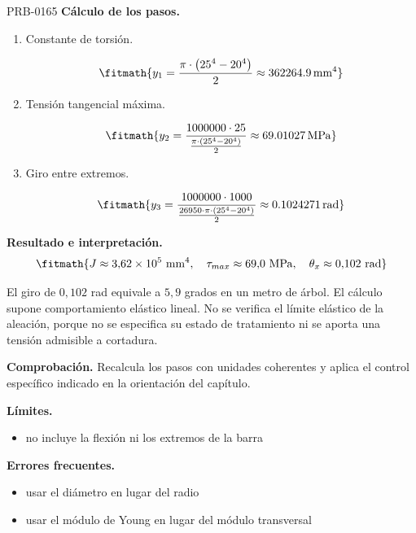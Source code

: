 \begin{studiumworked}{PRB-0165}
\textbf{Cálculo de los pasos.}

\begin{enumerate}

\item Constante de torsión.

\[\fitmath{y_{1}=\frac{\pi\cdot \left({25}^{4}-{20}^{4}\right)}{2}\approx 362264.9\,\mathrm{mm^{4}}}\]

\item Tensión tangencial máxima.

\[\fitmath{y_{2}=\frac{1000000\cdot 25}{\frac{\pi\cdot \left({25}^{4}-{20}^{4}\right)}{2}}\approx 69.01027\,\mathrm{MPa}}\]

\item Giro entre extremos.

\[\fitmath{y_{3}=\frac{1000000\cdot 1000}{\frac{26950\cdot \pi\cdot \left({25}^{4}-{20}^{4}\right)}{2}}\approx 0.1024271\,\mathrm{rad}}\]

\end{enumerate}

\textbf{Resultado e interpretación.}\[\fitmath{J \approx 3{,}62\times 10^{5}\ \mathrm{mm}^{4},\quad \tau_{max} \approx 69{,}0\ \mathrm{MPa},\quad \theta_x \approx 0{,}102\ \mathrm{rad}}\]

El giro de $0{,}102$ rad equivale a $5{,}9$ grados en un metro de árbol. El cálculo supone comportamiento elástico lineal. No se verifica el límite elástico de la aleación, porque no se especifica su estado de tratamiento ni se aporta una tensión admisible a cortadura.

\par\textbf{Comprobación.} Recalcula los pasos con unidades coherentes y aplica el control específico indicado en la orientación del capítulo.

\textbf{Límites.}\begin{itemize}\item no incluye la flexión ni los extremos de la barra\end{itemize}

\textbf{Errores frecuentes.}\begin{itemize}\item usar el diámetro en lugar del radio
\item usar el módulo de Young en lugar del módulo transversal\end{itemize}

\end{studiumworked}

\Needspace{.3\textheight}

